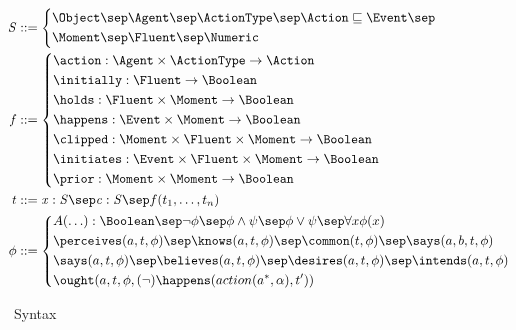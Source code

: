 \begin{figure}[ht!]
\begin{mdframed}[roundcorner=8pt, nobreak=true, frametitlealignment=\centering]
\begin{equation*}
 \begin{aligned}
    \mathit{S} &::= 
    \left\{\begin{aligned}
      & \Object \sep \Agent  \sep \ActionType \sep \Action \sqsubseteq
      \Event \sep \\ &\Moment  \sep \Fluent \sep \Numeric\\
    \end{aligned} \right.
    \\ 
    \hspace{-29pt}\mathit{f} &::= \left\{
    \begin{aligned}
      & \action: \Agent \times \ActionType \rightarrow \Action \\
      &  \initially: \Fluent \rightarrow \Boolean\\
      &  \holds: \Fluent \times \Moment \rightarrow \Boolean \\
      & \happens: \Event \times \Moment \rightarrow \Boolean \\
      & \clipped: \Moment \times \Fluent \times \Moment \rightarrow \Boolean \\
      & \initiates: \Event \times \Fluent \times \Moment \rightarrow \Boolean\\
      & \prior: \Moment \times \Moment \rightarrow \Boolean\\
    \end{aligned}\right.\\
        \mathit{t} &::=
    \begin{aligned}
      \mathit{x : S} \sep \mathit{c : S} \sep f(t_1,\ldots,t_n)
    \end{aligned}
    \\ 
    \mathit{\phi}&::= \left\{ 
    \begin{aligned}
     & A(\ldots):\Boolean \sep  \neg \phi \sep \phi \land \psi \sep \phi \lor
     \psi \sep \forall x \phi(x)\\
     & \perceives (a,t,\phi)  \sep \knows(a,t,\phi) \sep
     \common(t,\phi) \sep \says(a,b,t,\phi)  \\ 
&\says(a,t,\phi)
     \sep  \believes(a,t,\phi) \sep \desires(a,t,\phi) \sep
     \intends(a,t,\phi)\\
     & \ought(a,t,\phi,(\lnot)\happens(action(a^\ast,\alpha),t'))
      \end{aligned}\right.
  \end{aligned}
\end{equation*}
\end{mdframed}
\caption{\CEC\ Syntax}
\label{sig}
\end{figure}

